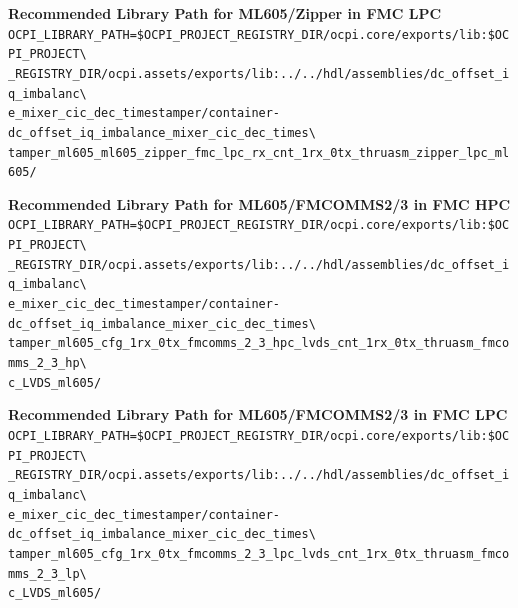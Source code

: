 \noindent\textbf{Recommended Library Path for ML605/Zipper in FMC LPC}\\

\noindent
\verb|OCPI_LIBRARY_PATH=$OCPI_PROJECT_REGISTRY_DIR/ocpi.core/exports/lib:$OCPI_PROJECT\| \\
\verb|_REGISTRY_DIR/ocpi.assets/exports/lib:../../hdl/assemblies/dc_offset_iq_imbalanc\| \\
\verb|e_mixer_cic_dec_timestamper/container-dc_offset_iq_imbalance_mixer_cic_dec_times\| \\
\verb|tamper_ml605_ml605_zipper_fmc_lpc_rx_cnt_1rx_0tx_thruasm_zipper_lpc_ml605/|
\par\medskip

\noindent\textbf{Recommended Library Path for ML605/FMCOMMS2/3 in FMC HPC}\\

\noindent
\verb|OCPI_LIBRARY_PATH=$OCPI_PROJECT_REGISTRY_DIR/ocpi.core/exports/lib:$OCPI_PROJECT\| \\
\verb|_REGISTRY_DIR/ocpi.assets/exports/lib:../../hdl/assemblies/dc_offset_iq_imbalanc\| \\
\verb|e_mixer_cic_dec_timestamper/container-dc_offset_iq_imbalance_mixer_cic_dec_times\| \\
\verb|tamper_ml605_cfg_1rx_0tx_fmcomms_2_3_hpc_lvds_cnt_1rx_0tx_thruasm_fmcomms_2_3_hp\| \\
\verb|c_LVDS_ml605/|
\par\medskip

\noindent\textbf{Recommended Library Path for ML605/FMCOMMS2/3 in FMC LPC}\\

\noindent
\verb|OCPI_LIBRARY_PATH=$OCPI_PROJECT_REGISTRY_DIR/ocpi.core/exports/lib:$OCPI_PROJECT\| \\
\verb|_REGISTRY_DIR/ocpi.assets/exports/lib:../../hdl/assemblies/dc_offset_iq_imbalanc\| \\
\verb|e_mixer_cic_dec_timestamper/container-dc_offset_iq_imbalance_mixer_cic_dec_times\| \\
\verb|tamper_ml605_cfg_1rx_0tx_fmcomms_2_3_lpc_lvds_cnt_1rx_0tx_thruasm_fmcomms_2_3_lp\| \\
\verb|c_LVDS_ml605/|
\par\medskip

